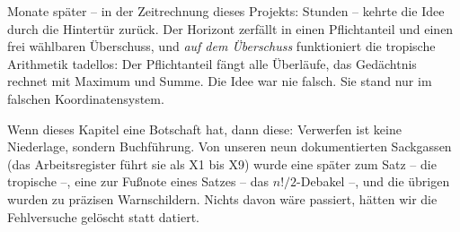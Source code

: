 Monate später -- in der Zeitrechnung dieses Projekts: Stunden --
kehrte die Idee durch die Hintertür zurück. Der Horizont zerfällt
in einen Pflichtanteil und einen frei wählbaren Überschuss, und
\emph{auf dem Überschuss} funktioniert die tropische Arithmetik
tadellos: Der Pflichtanteil fängt alle Überläufe, das Gedächtnis
rechnet mit Maximum und Summe. Die Idee war nie falsch. Sie stand
nur im falschen Koordinatensystem.

\begin{oberflaeche}
Wenn dieses Kapitel eine Botschaft hat, dann diese: Verwerfen ist
keine Niederlage, sondern Buchführung. Von unseren neun
dokumentierten Sackgassen (das Arbeitsregister führt sie als X1
bis X9) wurde eine später zum Satz -- die tropische --, eine zur
Fußnote eines Satzes -- das $n!/2$-Debakel --, und die übrigen
wurden zu präzisen Warnschildern.
Nichts davon wäre passiert, hätten wir die Fehlversuche gelöscht
statt datiert.
\end{oberflaeche}
